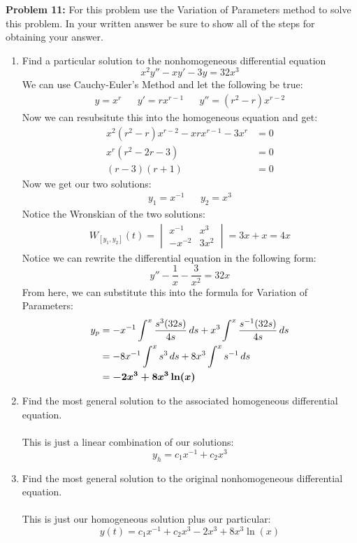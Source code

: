 \documentclass[12pt]{article}
\begin{document}
\noindent \textbf{Problem 11: }For this problem use the Variation of Parameters method to solve this problem. In your written answer be sure to show all of the steps for obtaining your answer.
	\begin{enumerate}[label = (\alph*)]
		\item Find a particular solution to the nonhomogeneous differential equation
			$$
			x^2y'' - xy' - 3y = 32 x^{3}
			$$
		We can use Cauchy-Euler's Method and let the following be true:
			\begin{align*}
				y = x^r && y' = rx^{r-1} && y'' = (r^2 - r)x^{r-2}
			\end{align*}
		Now we can resubsitute this into the homogeneous equation and get:
			\begin{align*}
				x^2(r^2 - r)x^{r-2} - xrx^{r-1} - 3x^r &= 0 \\
				x^r(r^2 - 2r - 3) &= 0 \\
				(r-3)(r+1) &= 0 
			\end{align*}
		Now we get our two solutions:
			\begin{align*}
				y_1 = x^{-1} && y_2 = x^3 
			\end{align*}
		Notice the Wronskian of the two solutions:
			\begin{align*}
				W_{[y_1,y_2]}(t) = 
				\begin{vmatrix}
					x^{-1} & x^3 \\
					-x^{-2} & 3x^2
				\end{vmatrix} 
				= 3x + x = 4x
			\end{align*}
		Notice we can rewrite the differential equation in the following form:
			$$
			y'' - \frac{1}{x} - \frac{3}{x^2} = 32x
			$$
		From here, we can substitute this into the formula for Variation of Parameters:
			\begin{align*}
				y_p &= -x^{-1} \int^x \frac{s^3(32s)}{4s}\,ds + x^3 \int^x \frac{s^{-1}(32s)}{4s}\,ds \\
				&= -8x^{-1}\int^x s^3\,ds + 8x^3 \int^x s^{-1}\,ds \\
				&= \text{\boldmath $-2x^{3} + 8x^3 \ln(x)$}
			\end{align*}
		\item Find the most general solution to the associated homogeneous differential equation.
		\\ \\
		This is just a linear combination of our solutions:
			\boldmath
			$$
			y_h = c_1x^{-1} + c_2x^{3}
			$$
			\unboldmath
		\item Find the most general solution to the original nonhomogeneous differential equation.
		\\ \\
		This is just our homogeneous solution plus our particular:
			\boldmath
			$$
			y(t) = c_1x^{-1} + c_2x^{3} -2x^{3} + 8x^3 \ln(x)
			$$
			\unboldmath
	\end{enumerate}
\end{document}
